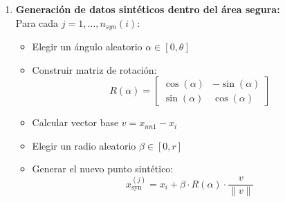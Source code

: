 \documentclass[12pt]{article}
\begin{document}
\begin{enumerate}[label=\textbf{\arabic*.}]
    \item \textbf{Generación de datos sintéticos dentro del área segura:}\\
    Para cada $j = 1, \ldots, n_{syn}(i)$:
    \begin{itemize}
        \item Elegir un ángulo aleatorio $\alpha \in [0, \theta]$
        \item Construir matriz de rotación:
        \[
        R(\alpha) =
        \begin{bmatrix}
        \cos(\alpha) & -\sin(\alpha) \\
        \sin(\alpha) & \cos(\alpha)
        \end{bmatrix}
        \]
        \item Calcular vector base $v = x_{nn1} - x_i$
        \item Elegir un radio aleatorio $\beta \in [0, r]$
        \item Generar el nuevo punto sintético:
        \[
        x_{\text{syn}}^{(j)} = x_i + \beta \cdot R(\alpha) \cdot \frac{v}{\|v\|}
        \]
    \end{itemize}
\end{enumerate}
\end{document}
